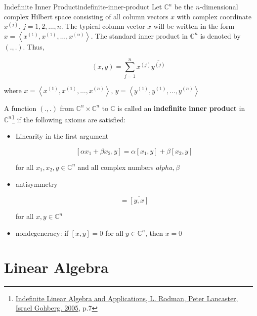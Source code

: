 \begin{Definition}{Indefinite Inner Product}{indefinite-inner-product}
    Let $\mathbb{C}^n$ be the $n$-dimensional complex Hilbert space consisting of all column vectors $x$ with complex
    coordinate $x^{(j)}$, $j = 1, 2, \ldots, n$. The typical column vector $x$ will be written in the form
    $x = \left< x^{(1)}, x^{(1)}, \ldots, x^{(n)} \right>$. The standard inner product in $\mathbb{C}^n$ is denoted by
    $(.,.)$. Thus,

    \begin{equation}
        (x, y) = \sum_{j = 1}^n x^{(j)}\overline{y^{(j)}}
    \end{equation}

    where $x = \left< x^{(1)}, x^{(1)}, \ldots, x^{(n)} \right>$, $y = \left< y^{(1)}, y^{(1)}, \ldots, y^{(n)} \right>$

    A function $(.,.)$ from $\mathbb{C}^n \times \mathbb{C}^n$ to $\mathbb{C}$ is called an \textbf{indefinite inner
    product} in $\mathbb{C}^n$\footnote{\href{https://trello.com/c/lJkdFDVf}{Indefinite Linear Algebra and Applications, L. Rodman, Peter Lancaster, Israel Gohberg. 2005}, p.7} if the following axioms are satisfied:

    \begin{itemize}
        \item Linearity in the first argument

              \begin{equation}
                  \left[ \alpha x_1 + \beta x_2, y \right] = \alpha [x_1, y] + \beta [x_2, y]
              \end{equation}

              for all $x_1, x_2, y \in \mathbb{C}^n$ and all complex numbers $alpha, \beta$
        \item antisymmetry

              \begin{equation}
                  [x, y] = \overline{[y, x]}
              \end{equation}

              for all $x, y \in \mathbb{C}^n$

        \item nondegeneracy: if $[x, y] = 0$ for all $y \in \mathbb{C}^n$, then $x = 0$
    \end{itemize}
\end{Definition}

\section{Linear Algebra}

